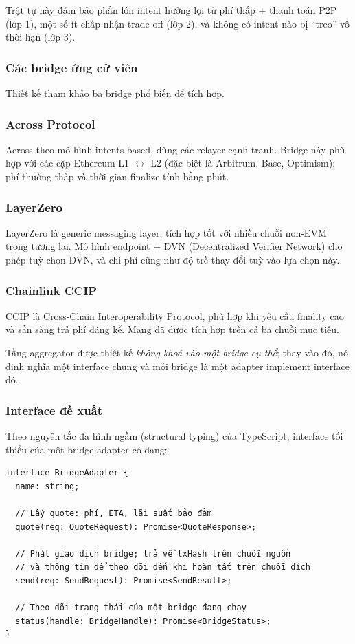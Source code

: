 Trật tự này đảm bảo phần lớn intent hưởng lợi từ phí thấp + thanh toán P2P (lớp 1), một số ít chấp nhận trade-off (lớp 2), và không có intent nào bị ``treo'' vô thời hạn (lớp 3).

\subsubsection{Các bridge ứng cử viên}

Thiết kế tham khảo ba bridge phổ biến để tích hợp.

\subsubsection*{Across Protocol}

Across theo mô hình intents-based, dùng các relayer cạnh tranh. Bridge này phù hợp với các cặp Ethereum L1 $\leftrightarrow$ L2 (đặc biệt là Arbitrum, Base, Optimism); phí thường thấp và thời gian finalize tính bằng phút.

\subsubsection*{LayerZero}

LayerZero là generic messaging layer, tích hợp tốt với nhiều chuỗi non-EVM trong tương lai. Mô hình endpoint + DVN (Decentralized Verifier Network) cho phép tuỳ chọn DVN, và chi phí cũng như độ trễ thay đổi tuỳ vào lựa chọn này.

\subsubsection*{Chainlink CCIP}

CCIP là Cross-Chain Interoperability Protocol, phù hợp khi yêu cầu finality cao và sẵn sàng trả phí đáng kể. Mạng đã được tích hợp trên cả ba chuỗi mục tiêu.

Tầng aggregator được thiết kế \emph{không khoá vào một bridge cụ thể}; thay vào đó, nó định nghĩa một interface chung và mỗi bridge là một adapter implement interface đó.

\subsubsection{Interface đề xuất}

Theo nguyên tắc đa hình ngầm (structural typing) của TypeScript, interface tối thiểu của một bridge adapter có dạng:

\begin{verbatim}
interface BridgeAdapter {
  name: string;

  // Lấy quote: phí, ETA, lãi suất bảo đảm
  quote(req: QuoteRequest): Promise<QuoteResponse>;

  // Phát giao dịch bridge; trả về txHash trên chuỗi nguồn
  // và thông tin để theo dõi đến khi hoàn tất trên chuỗi đích
  send(req: SendRequest): Promise<SendResult>;

  // Theo dõi trạng thái của một bridge đang chạy
  status(handle: BridgeHandle): Promise<BridgeStatus>;
}
\end{verbatim}


